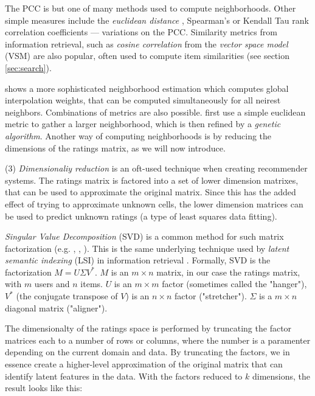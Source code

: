 The PCC is but one of many methods used to compute neighborhoods. 
Other simple measures include the \emph{euclidean distance} \cite[p10]{Segaran2007},
Spearman's or Kendall Tau rank correlation coefficients \cite[p30]{Herlocker2004} --- 
variations on the PCC.
Similarity metrics from information retrieval,
such as \emph{cosine correlation} from the \emph{vector space model} (VSM) are also popular,
often used to compute item similarities (see section \ref{sec:search}).

\cite{Bell2007a} shows a more sophisticated neighborhood estimation which computes global interpolation weights,
that can be computed simultaneously for all neirest neighbors.
Combinations of metrics are also possible. 
\cite{Ujjin} first use a simple euclidean metric to gather a larger neighborhood, which is then refined
by a \emph{genetic algorithm}.
Another way of computing neighborhoods is by reducing the dimensions of the ratings matrix,
as we will now introduce.


(3) \emph{Dimensionaliy reduction} is an oft-used technique when creating recommender systems.
The ratings matrix is factored into a set of lower dimension matrixes, that can be used to approximate the original matrix.
Since this has the added effect of trying to approximate unknown cells, the lower dimension matrices
can be used to predict unknown ratings (a type of least squares data fitting).

\emph{Singular Value Decomposition} (SVD) is a common method for such matrix factorization (e.g. \citet[p5]{Billsus}, \citet{Sun2005}, \citet{Bell2007}).  
This is the same underlying technique used by \emph{latent semantic indexing} (LSI) in information retrieval \cite[p44]{Baeza-Yates1999}.
Formally, SVD is the factorization $M = U \Sigma V^{*}$. 
$M$ is an $m \times n$ matrix, in our case the ratings matrix, with $m$ users and $n$ items. 
$U$ is an $m \times m$ factor (sometimes called the "hanger"), $V^{*}$ (the conjugate transpose of $V$) is an $n \times n$ factor ("stretcher").
$\Sigma$ is a $m \times n$ diagonal matrix ("aligner"). 

The dimensionalty of the ratings space is performed by truncating the factor matrices each to a number of rows or columns, 
where the number is a paramenter depending on the current domain and data. By truncating the factors, 
we in essence create a higher-level approximation of the original matrix that can identify latent features in the data.
With the factors reduced to $k$ dimensions, the result looks like this:

